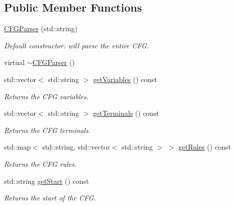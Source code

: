 \subsection*{\-Public \-Member \-Functions}
\begin{DoxyCompactItemize}
\item 
\hyperlink{classparser_1_1CFGParser_adfc299d4c11f48a08c27c4e07a11d3ef}{\-C\-F\-G\-Parser} (std\-::string)
\begin{DoxyCompactList}\small\item\em \-Default constructor\-: will parse the entire \-C\-F\-G. \end{DoxyCompactList}\item 
virtual \hyperlink{classparser_1_1CFGParser_af49c545d6ff832401e91d0e10c6e3d39}{$\sim$\-C\-F\-G\-Parser} ()
\item 
std\-::vector$<$ std\-::string $>$ \hyperlink{classparser_1_1CFGParser_aa8200b6b3e2e1e2e39d00c3067993c32}{get\-Variables} () const 
\begin{DoxyCompactList}\small\item\em \-Returns the \-C\-F\-G variables. \end{DoxyCompactList}\item 
std\-::vector$<$ std\-::string $>$ \hyperlink{classparser_1_1CFGParser_a6bef668d8312ae21bd194c57cc27ad6b}{get\-Terminals} () const 
\begin{DoxyCompactList}\small\item\em \-Returns the \-C\-F\-G terminals. \end{DoxyCompactList}\item 
std\-::map$<$ std\-::string, \*
std\-::vector$<$ std\-::string $>$ $>$ \hyperlink{classparser_1_1CFGParser_ab1cb8d295814c86d938ef4de7d626b37}{get\-Rules} () const 
\begin{DoxyCompactList}\small\item\em \-Returns the \-C\-F\-G rules. \end{DoxyCompactList}\item 
std\-::string \hyperlink{classparser_1_1CFGParser_a76cc197ff3c26f119032896b0099322e}{get\-Start} () const 
\begin{DoxyCompactList}\small\item\em \-Returns the start of the \-C\-F\-G. \end{DoxyCompactList}\end{DoxyCompactItemize}
